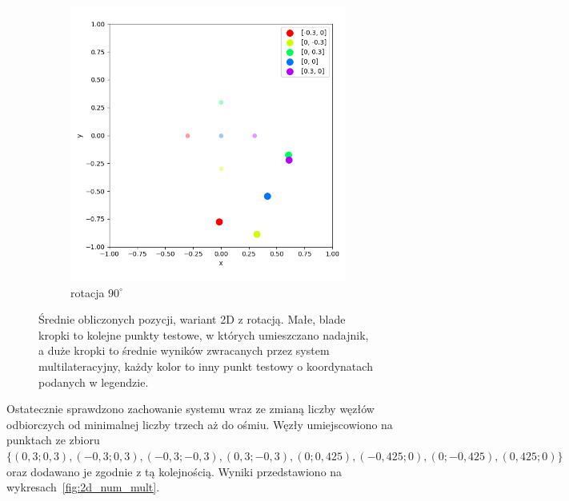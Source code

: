 \begin{figure}[H]
    \ContinuedFloat\centering
    \begin{subfigure}{.5\textwidth}
        \centering
        \includegraphics[width=\linewidth]{pics/mult_lat_2d_angle/positions_90_mean.png}
        \caption{rotacja $90^{\circ}$}
        \label{pic:2d_90_angle_mult}
    \end{subfigure}
    \caption[Wyniki eksperymentu dla wersji 2D z rotacją]{Średnie obliczonych pozycji, wariant 2D z rotacją. Małe, blade kropki to kolejne punkty testowe, w których umieszczano nadajnik, a duże kropki to średnie wyników zwracanych przez system multilateracyjny, każdy kolor to inny punkt testowy o koordynatach podanych w legendzie.}
    \label{fig:2d_angle_mult}
\end{figure}

Ostatecznie sprawdzono zachowanie systemu wraz ze zmianą liczby węzłów odbiorczych od minimalnej liczby trzech aż do ośmiu. Węzły umiejscowiono na punktach ze zbioru $\{(0,3;0,3), (-0,3;0,3), (-0,3;-0,3), (0,3;-0,3), (0; 0,425), (-0,425; 0), (0; -0,425), (0,425; 0)\}$ oraz dodawano je zgodnie z tą kolejnością. Wyniki przedstawiono na wykresach~\ref{fig:2d_num_mult}. 

